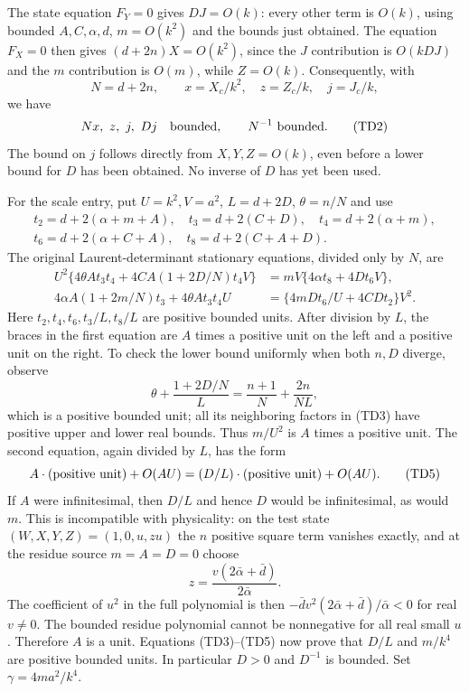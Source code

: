 The state equation $F_Y=0$ gives $DJ=O(k)$: every other term is
$O(k)$, using bounded $A,C,\alpha,d$, $m=O(k^2)$ and the bounds
just obtained. The equation $F_X=0$ then gives
$(d+2n)X=O(k^2)$, since the $J$ contribution is $O(kDJ)$ and the
$m$ contribution is $O(m)$, while $Z=O(k)$. Consequently, with
\[
 N=d+2n,\qquad x=X_c/k^2,\quad z=Z_c/k,\quad j=J_c/k,
\]
we have
\[
 Nx,\ z,\ j,\ Dj\quad\hbox{bounded},\qquad N^{-1}\ \hbox{bounded}.
                                                               \tag{TD2}
\]
The bound on $j$ follows directly from $X,Y,Z=O(k)$, even before a
lower bound for $D$ has been obtained. No inverse of $D$ has yet
been used.

For the scale entry, put $U=k^2,V=a^2$, $L=d+2D$,
$\theta=n/N$ and use
\[
\begin{gathered}
t_2=d+2(\alpha+m+A),\quad t_3=d+2(C+D),\quad
 t_4=d+2(\alpha+m),\\
t_6=d+2(\alpha+C+A),\quad t_8=d+2(C+A+D).
\end{gathered}
\]
The original Laurent-determinant stationary equations, divided only
by $N$, are
\[
\begin{split}
U^2\{4\theta A t_3t_4+4CA(1+2D/N)t_4V\}
 &=mV\{4\alpha t_8+4Dt_6V\},\\
4\alpha A(1+2m/N)t_3+4\theta A t_3t_4U
 &=\{4mDt_6/U+4CDt_2\}V^2.
\end{split}                       \tag{TD3}
\]
Here $t_2,t_4,t_6,t_3/L,t_8/L$ are positive bounded units.
After division by $L$, the braces in the first equation are
$A$ times a positive unit on the left and a positive unit on the
right. To check the lower bound uniformly when both $n,D$ diverge,
observe
\[
 \theta+\frac{1+2D/N}{L}
 =\frac{n+1}{N}+\frac{2n}{NL},                    \tag{TD4}
\]
which is a positive bounded unit; all its neighboring factors in
(TD3) have positive upper and lower real bounds. Thus
$m/U^2$ is $A$ times a positive unit. The second equation, again
divided by $L$, has the form
\[
 A\cdot(\hbox{positive unit})+O(AU)
    =(D/L)\cdot(\hbox{positive unit})+O(AU).       \tag{TD5}
\]
If $A$ were infinitesimal, then $D/L$ and hence $D$ would be
infinitesimal, as would $m$. This is incompatible with physicality:
on the test state $(W,X,Y,Z)=(1,0,u,zu)$ the $n$ positive square term vanishes
exactly, and at the residue source $m=A=D=0$ choose
\[
 z=\frac{v(2\bar\alpha+\bar d)}{2\bar\alpha}.
\]
The coefficient of $u^2$ in the full polynomial is then
$-\bar d v^2(2\bar\alpha+\bar d)/\bar\alpha<0$ for real $v\ne0$.
The bounded residue polynomial cannot be nonnegative for all real
small $u$. Therefore $A$ is a unit. Equations (TD3)--(TD5) now prove
that $D/L$ and $m/k^4$ are positive bounded units. In particular
$D>0$ and $D^{-1}$ is bounded. Set $\gamma=4ma^2/k^4$.

